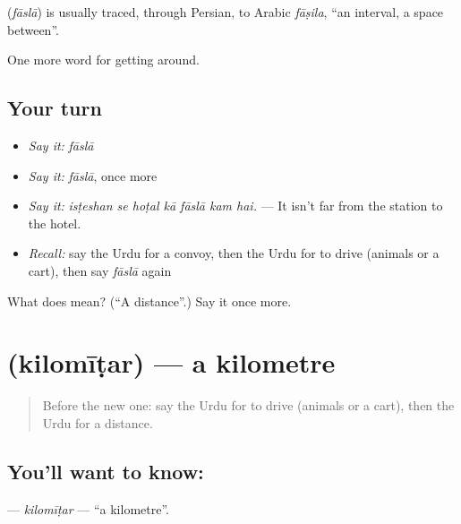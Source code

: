 \begin{cousinweb}
\textbf{} (\emph{fāslā}) is usually traced, through Persian, to Arabic \emph{fāṣila}, \textquotedblleft{}an interval, a space between\textquotedblright{}.
\end{cousinweb}

\begin{grammarlens}[title={What you've built}]
One more word for getting around.
\end{grammarlens}

\subsection*{Your turn}
\begin{itemize}
\raggedright
  \item \emph{Say it:} \emph{fāslā}
  \item \emph{Say it:} \emph{fāslā}, once more
  \item \emph{Say it:} \emph{isṭeshan se hoṭal kā fāslā kam hai.} — It isn't far from the station to the hotel.
  \item \emph{Recall:} say the Urdu for a convoy, then the Urdu for to drive (animals or a cart), then say \emph{fāslā} again
\end{itemize}

\begin{tcolorbox}[breakable,colback=teal!4,colframe=teal!35!black,title={Before you move on}]
What does  mean? (\textquotedblleft{}A distance\textquotedblright{}.) Say it once more.
\end{tcolorbox}
\section[\texorpdfstring{\ur{کلومیٹر} (kilomīṭar)}{کلومیٹر (kilomīṭar)}]{ (kilomīṭar) — a kilometre}

\label{lesson:UR-C397-kilomitar}



\begin{quote}
Before the new one: say the Urdu for to drive (animals or a cart), then the Urdu for a distance.
\end{quote}

\subsection*{You'll want to know: }
\textbf{} — \emph{kilomīṭar} — \textquotedblleft{}a kilometre\textquotedblright{}.


